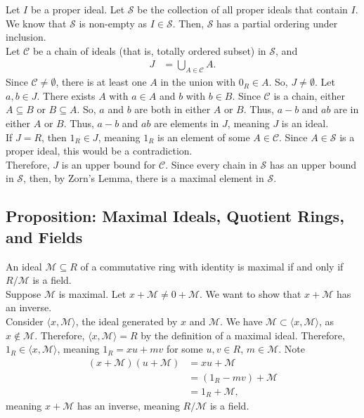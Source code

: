 \documentclass[8pt]{extarticle}
\begin{document}
  Let $I$ be a proper ideal. Let $\mathcal{S}$ be the collection of all proper ideals that contain $I$. We know that $\mathcal{S}$ is non-empty as $I\in \mathcal{S}$. Then, $\mathcal{S}$ has a partial ordering under inclusion.\\

  Let $\mathcal{C}$ be a chain of ideals (that is, totally ordered subset) in $\mathcal{S}$, and 
  \begin{align*}
    J &= \bigcup_{A\in\mathcal{C}}A.
  \end{align*}
  Since $\mathcal{C} \neq \emptyset$, there is at least one $A$ in the union with $0_R \in A$. So, $J \neq \emptyset$. Let $a,b\in J$. There exists $A$ with $a\in A$ and $b$ with $b\in B$. Since $\mathcal{C}$ is a chain, either $A\subseteq B$ or $B\subseteq A$. So, $a$ and $b$ are both in either $A$ or $B$. Thus, $a-b$ and $ab$ are in either $A$ or $B$. Thus, $a-b$ and $ab$ are elements in $J$, meaning $J$ is an ideal.\\

  If $J = R$, then $1_R \in J$, meaning $1_R$ is an element of some $A\in \mathcal{C}$. Since $A\in \mathcal{S}$ is a proper ideal, this would be a contradiction.\\

  Therefore, $J$ is an upper bound for $\mathcal{C}$. Since every chain in $\mathcal{S}$ has an upper bound in $\mathcal{S}$, then, by Zorn's Lemma, there is a maximal element in $\mathcal{S}$.
  
  \subsection{Proposition: Maximal Ideals, Quotient Rings, and Fields}%
  An ideal $\mathcal{M}\subseteq R$ of a commutative ring with identity is maximal if and only if $R/\mathcal{M}$ is a field.\\

  Suppose $\mathcal{M}$ is maximal. Let $x + \mathcal{M} \neq 0 + \mathcal{M}$. We want to show that $x + \mathcal{M}$ has an inverse.\\

  Consider $\langle x,\mathcal{M}\rangle$, the ideal generated by $x$ and $\mathcal{M}$. We have $\mathcal{M} \subset \langle x,\mathcal{M}\rangle$, as $x\notin \mathcal{M}$. Therefore, $\langle x,\mathcal{M}\rangle = R$ by the definition of a maximal ideal. Therefore, $1_R \in \langle x,\mathcal{M}\rangle$, meaning $1_R = xu + mv$ for some $u,v\in R$, $m\in \mathcal{M}$. Note
  \begin{align*}
    (x + \mathcal{M})(u + \mathcal{M}) &= xu + \mathcal{M}\\
                                       &= (1_R - mv) + \mathcal{M}\\
                                       &= 1_R + \mathcal{M},
  \end{align*}
  meaning $x + \mathcal{M}$ has an inverse, meaning $R/\mathcal{M}$ is a field.\\
\end{document}
